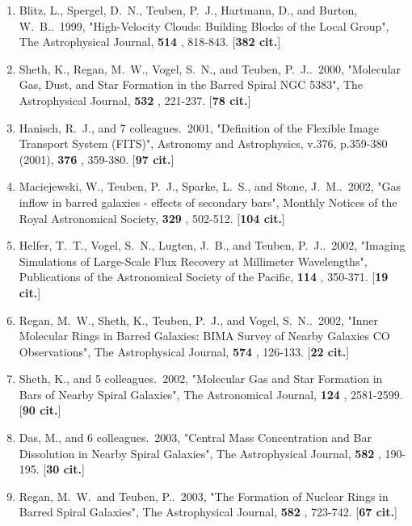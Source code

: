 \documentclass[11pt,letterpaper]{article}
\begin{document}
\begin{enumerate}[resume,label=\textbf{\arabic*}.]
\item  
Blitz, L., Spergel, D.~N., Teuben, P.~J., Hartmann, D., and Burton, W.~B..\  
1999,  "High-Velocity Clouds: Building Blocks of the Local Group", The 
Astrophysical Journal,  {\bf 514} , 818-843.  [{\bf 382 cit.}] 

\item  
Sheth, K., Regan, M.~W., Vogel, S.~N., and Teuben, P.~J..\  2000,  
"Molecular Gas, Dust, and Star Formation in the Barred Spiral NGC 5383", 
The Astrophysical Journal,  {\bf 532} , 221-237.  [{\bf 78 cit.}] 

\item  
Hanisch, R.~J., and 7 colleagues.\  2001,  "Definition of the Flexible 
Image Transport System (FITS)", Astronomy and Astrophysics, v.376, 
p.359-380 (2001),  {\bf 376} , 359-380.  [{\bf 97 cit.}] 

\item  
Maciejewski, W., Teuben, P.~J., Sparke, L.~S., and Stone, J.~M..\  2002,  
"Gas inflow in barred galaxies - effects of secondary bars", Monthly 
Notices of the Royal Astronomical Society,  {\bf 329} , 502-512.  [{\bf 104 
cit.}] 

\item  
Helfer, T.~T., Vogel, S.~N., Lugten, J.~B., and Teuben, P.~J..\  2002,  
"Imaging Simulations of Large-Scale Flux Recovery at Millimeter 
Wavelengths", Publications of the Astronomical Society of the Pacific,  
{\bf 114} , 350-371.  [{\bf 19 cit.}] 

\item  
Regan, M.~W., Sheth, K., Teuben, P.~J., and Vogel, S.~N..\  2002,  "Inner 
Molecular Rings in Barred Galaxies: BIMA Survey of Nearby Galaxies CO 
Observations", The Astrophysical Journal,  {\bf 574} , 126-133.  [{\bf 22 
cit.}] 

\item  
Sheth, K., and 5 colleagues.\  2002,  "Molecular Gas and Star Formation in 
Bars of Nearby Spiral Galaxies", The Astronomical Journal,  {\bf 124} , 
2581-2599.  [{\bf 90 cit.}] 

\item  
Das, M., and 6 colleagues.\  2003,  "Central Mass Concentration and Bar 
Dissolution in Nearby Spiral Galaxies", The Astrophysical Journal,  {\bf 
582} , 190-195.  [{\bf 30 cit.}] 

\item  
Regan, M.~W.~and Teuben, P..\  2003,  "The Formation of Nuclear Rings in 
Barred Spiral Galaxies", The Astrophysical Journal,  {\bf 582} , 723-742.  
[{\bf 67 cit.}] 


\end{enumerate}
\end{document}

